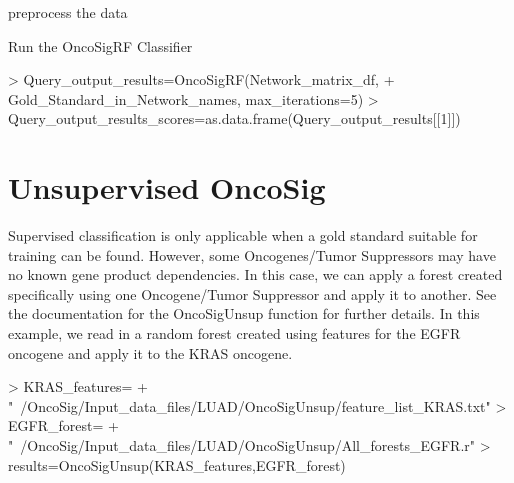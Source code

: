\documentclass{article}
\begin{document}
preprocess the data
\begin{Schunk}
\end{Schunk}
Run the OncoSigRF Classifier
\begin{Schunk}
\begin{Sinput}
> Query_output_results=OncoSigRF(Network_matrix_df,
+               Gold_Standard_in_Network_names, max_iterations=5)
> Query_output_results_scores=as.data.frame(Query_output_results[[1]])
\end{Sinput}
\end{Schunk}

\section*{Unsupervised OncoSig}
Supervised classification is only applicable when a gold standard suitable for training can be found. However, some Oncogenes/Tumor Suppressors may have no known gene product dependencies. In this case, we can apply a forest created specifically using one Oncogene/Tumor Suppressor and apply it to another. See the documentation for the OncoSigUnsup function for further details. In this example, we read in a random forest created using features for the EGFR oncogene and apply it to the KRAS oncogene.
\begin{Schunk}
\begin{Sinput}
> KRAS_features=
+   "~/OncoSig/Input_data_files/LUAD/OncoSigUnsup/feature_list_KRAS.txt"
> EGFR_forest=
+   "~/OncoSig/Input_data_files/LUAD/OncoSigUnsup/All_forests_EGFR.r"
> results=OncoSigUnsup(KRAS_features,EGFR_forest)
\end{Sinput}
\end{Schunk}
\end{document}
